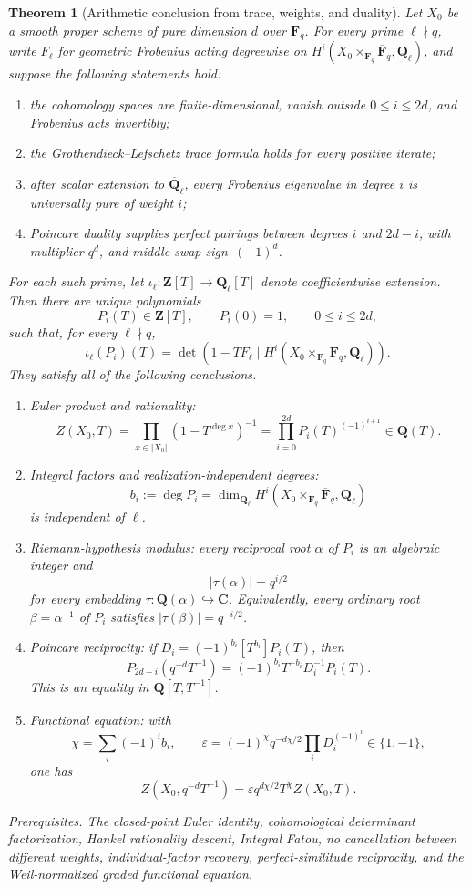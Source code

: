 \documentclass[10pt]{article}
\newtheorem{theorem}{Theorem}[section]
\theoremstyle{definition}
\newcommand{\Fq}{\mathbf F_q}
\newcommand{\Fbar}{\overline{\mathbf F}_q}
\newcommand{\Ql}{\mathbf Q_\ell}
\newcommand{\Qlb}{\overline{\mathbf Q}_\ell}
\newcommand{\deps}[1]{\par\smallskip\noindent\textit{Prerequisites.} #1}
\begin{document}
\begin{theorem}[Arithmetic conclusion from trace, weights, and duality]
Let \(X_0\) be a smooth proper scheme of pure dimension \(d\) over
\(\Fq\).  For every prime \(\ell\nmid q\), write \(F_\ell\) for geometric
Frobenius acting degreewise on
\(H^i(X_0\times_{\Fq}\Fbar,\Ql)\), and suppose the following statements
hold:
\begin{enumerate}[label=\textup{(\roman*)}]
\item the cohomology spaces are finite-dimensional, vanish outside
      \(0\leq i\leq2d\), and Frobenius acts invertibly;
\item the Grothendieck--Lefschetz trace formula holds for every positive
      iterate;
\item after scalar extension to \(\Qlb\), every Frobenius eigenvalue in
      degree \(i\) is universally pure of weight \(i\);
\item Poincare duality supplies perfect pairings between degrees \(i\) and
      \(2d-i\), with multiplier \(q^d\), and middle swap sign
      \(\,(-1)^d\).
\end{enumerate}
For each such prime, let
\(\iota_\ell:\mathbf Z[T]\to\Ql[T]\) denote coefficientwise extension.
Then there are unique polynomials
\[
 P_i(T)\in\mathbf Z[T],\qquad P_i(0)=1,
 \qquad0\leq i\leq2d,
\]
such that, for every \(\ell\nmid q\),
\[
 \iota_\ell(P_i)(T)
 =\det(1-TF_\ell\mid H^i(X_0\times_{\Fq}\Fbar,\Ql)).
\]
They satisfy all of the following conclusions.
\begin{enumerate}[label=\textup{(\alph*)}]
\item \textup{Euler product and rationality:}
\[
 Z(X_0,T)=\prod_{x\in|X_0|}(1-T^{\deg x})^{-1}
 =\prod_{i=0}^{2d}P_i(T)^{(-1)^{i+1}}
 \in\mathbf Q(T).
\]
\item \textup{Integral factors and realization-independent degrees:}
\[
 b_i:=\deg P_i
 =\dim_{\Ql}H^i(X_0\times_{\Fq}\Fbar,\Ql)
\]
is independent of \(\ell\).
\item \textup{Riemann-hypothesis modulus:} every reciprocal root
      \(\alpha\) of \(P_i\) is an algebraic integer and
\[
 |\tau(\alpha)|=q^{i/2}
\]
      for every embedding
      \(\tau:\mathbf Q(\alpha)\hookrightarrow\mathbf C\).  Equivalently,
      every ordinary root \(\beta=\alpha^{-1}\) of \(P_i\) satisfies
      \( |\tau(\beta)|=q^{-i/2}\).
\item \textup{Poincare reciprocity:} if
      \(D_i=(-1)^{b_i}[T^{b_i}]P_i(T)\), then
\[
 P_{2d-i}(q^{-d}T^{-1})
 =(-1)^{b_i}T^{-b_i}D_i^{-1}P_i(T).
\]
      This is an equality in \(\mathbf Q[T,T^{-1}]\).
\item \textup{Functional equation:} with
\[
 \chi=\sum_i(-1)^ib_i,\qquad
 \varepsilon=(-1)^\chi q^{-d\chi/2}
 \prod_iD_i^{(-1)^i}\in\{1,-1\},
\]
      one has
\[
 \boxed{
 Z(X_0,q^{-d}T^{-1})
 =\varepsilon q^{d\chi/2}T^\chi Z(X_0,T).}
\]
\end{enumerate}
\deps{The closed-point Euler identity, cohomological determinant
factorization, Hankel rationality descent, Integral Fatou, no cancellation
between different weights, individual-factor recovery, perfect-similitude
reciprocity, and the Weil-normalized graded functional equation.}
\end{theorem}
\end{document}
